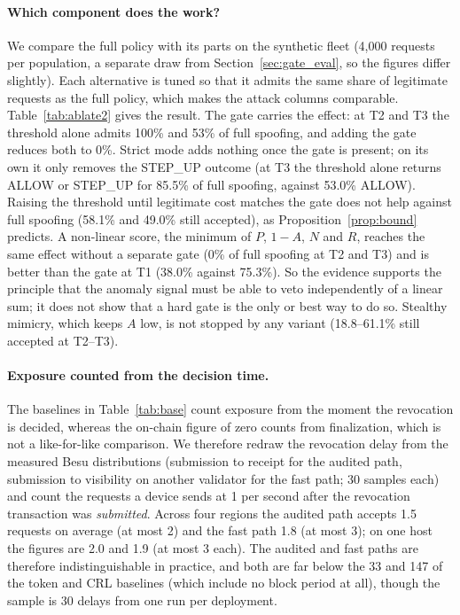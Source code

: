\paragraph{Which component does the work?}\label{sec:ablation2} We compare the full policy with its parts on the synthetic fleet (4{,}000 requests per population, a separate draw from Section~\ref{sec:gate_eval}, so the figures differ slightly). Each alternative is tuned so that it admits the same share of legitimate requests as the full policy, which makes the attack columns comparable. Table~\ref{tab:ablate2} gives the result. The gate carries the effect: at T2 and T3 the threshold alone admits 100\% and 53\% of full spoofing, and adding the gate reduces both to 0\%. Strict mode adds nothing once the gate is present; on its own it only removes the STEP\_UP outcome (at T3 the threshold alone returns ALLOW or STEP\_UP for 85.5\% of full spoofing, against 53.0\% ALLOW). Raising the threshold until legitimate cost matches the gate does not help against full spoofing (58.1\% and 49.0\% still accepted), as Proposition~\ref{prop:bound} predicts. A non-linear score, the minimum of $P$, $1-A$, $N$ and $R$, reaches the same effect without a separate gate (0\% of full spoofing at T2 and T3) and is better than the gate at T1 (38.0\% against 75.3\%). So the evidence supports the principle that the anomaly signal must be able to veto independently of a linear sum; it does not show that a hard gate is the only or best way to do so. Stealthy mimicry, which keeps $A$ low, is not stopped by any variant (18.8--61.1\% still accepted at T2--T3).

\begin{table}[t]
\centering
\caption{Ablation at matched legitimate allowance: attack requests accepted (\%), ALLOW only (4{,}000 requests per population, one seed). Full = gate and strict mode}
\label{tab:ablate2}
\scriptsize
\setlength{\tabcolsep}{3pt}

\end{table}

\paragraph{Exposure counted from the decision time.}\label{sec:exposure_eval} The baselines in Table~\ref{tab:base} count exposure from the moment the revocation is decided, whereas the on-chain figure of zero counts from finalization, which is not a like-for-like comparison. We therefore redraw the revocation delay from the measured Besu distributions (submission to receipt for the audited path, submission to visibility on another validator for the fast path; 30 samples each) and count the requests a device sends at 1 per second after the revocation transaction was \emph{submitted}. Across four regions the audited path accepts 1.5 requests on average (at most 2) and the fast path 1.8 (at most 3); on one host the figures are 2.0 and 1.9 (at most 3 each). The audited and fast paths are therefore indistinguishable in practice, and both are far below the 33 and 147 of the token and CRL baselines (which include no block period at all), though the sample is 30 delays from one run per deployment.

